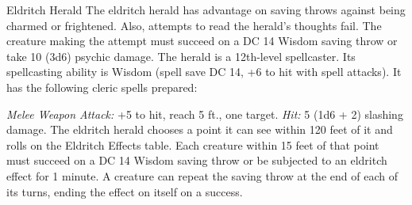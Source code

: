 \documentclass[10pt,a4paper,twoside,twocolumn,openany,bg=print,nodeprecatedcode]{dndbook}
\begin{document}
\begin{DndMonster}[float*=t]{Eldritch Herald}
\DndMonsterBasics[
armor-class = {16 (breastplate)},
hit-points = {\DndDice{12d8 + 24}},
speed = {30 ft.}
]
\DndMonsterAbilityScores[
 str = 14,
 dex = 11,
 con = 15,
 int = 10,
 wis = 17,
 cha = 12
]
\DndMonsterDetails[
skills = {Perception +6, Religion +3},
damage-resistances = {psychic},
languages = {any two languages},
challenge = 5,
]
The eldritch herald has advantage on saving throws against being charmed or frightened. Also, attempts to read the herald's thoughts fail. The creature making the attempt must succeed on a DC 14 Wisdom saving throw or take 10 (3d6) psychic damage.
The herald is a 12th-level spellcaster. Its spellcasting ability is Wisdom (spell save DC 14, +6 to hit with spell attacks). It has the following cleric spells prepared:
\begin{DndMonsterSpells}
\end{DndMonsterSpells}
\par
{}
\textsl{Melee Weapon Attack:} +5 to hit, reach 5 ft., one target. \textsl{Hit:} 5 (1d6 + 2) slashing damage.
The eldritch herald chooses a point it can see within 120 feet of it and rolls on the Eldritch Effects table. Each creature within 15 feet of that point must succeed on a DC 14 Wisdom saving throw or be subjected to an eldritch effect for 1 minute. A creature can repeat the saving throw at the end of each of its turns, ending the effect on itself on a success.
\end{DndMonster}


\clearpage
\end{document}
